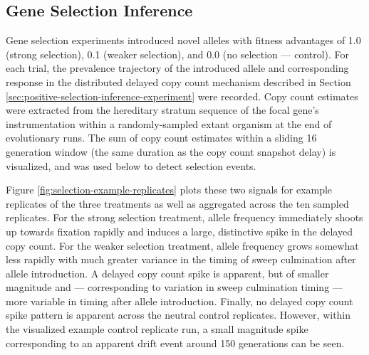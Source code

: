 \subsection{Gene Selection Inference}



Gene selection experiments introduced novel alleles with fitness advantages of 1.0 (strong selection), 0.1 (weaker selection), and 0.0 (no selection --- control).
For each trial, the prevalence trajectory of the introduced allele and corresponding response in the distributed delayed copy count mechanism described in Section \ref{sec:positive-selection-inference-experiment} were recorded.
Copy count estimates were extracted from the hereditary stratum sequence of the focal gene's instrumentation within a randomly-sampled extant organism at the end of evolutionary runs.
The sum of copy count estimates within a sliding 16 generation window (the same duration as the copy count snapshot delay) is visualized, and was used below to detect selection events.

Figure \ref{fig:selection-example-replicates} plots these two signals for example replicates of the three treatments as well as aggregated across the ten sampled replicates.
For the strong selection treatment, allele frequency immediately shoots up towards fixation rapidly and induces a large, distinctive spike in the delayed copy count.
For the weaker selection treatment, allele frequency grows somewhat less rapidly with much greater variance in the timing of sweep culmination after allele introduction.
A delayed copy count spike is apparent, but of smaller magnitude and --- corresponding to variation in sweep culmination timing --- more variable in timing after allele introduction.
Finally, no delayed copy count spike pattern is apparent across the neutral control replicates.
However, within the visualized example control replicate run, a small magnitude spike corresponding to an apparent drift event around 150 generations can be seen.



